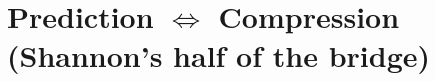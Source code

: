 %

%
%
%


\section{Prediction \texorpdfstring{$\Leftrightarrow$}{<=>} Compression
         (Shannon's half of the bridge)}
\label{sec:pred-comp}

